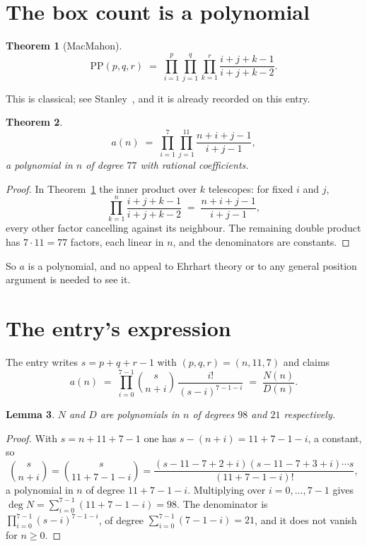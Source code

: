 \documentclass[11pt,a4paper]{article}
\theoremstyle{plain}
\newtheorem{theorem}{Theorem}
\newtheorem{lemma}[theorem]{Lemma}
\theoremstyle{definition}
\begin{document}
\section{The box count is a polynomial}

\begin{theorem}[MacMahon]\label{thm:mm}
\[
\mathrm{PP}(p,q,r)\;=\;\prod_{i=1}^{p}\prod_{j=1}^{q}\prod_{k=1}^{r}
\frac{i+j+k-1}{i+j+k-2} .
\]
\end{theorem}

This is classical; see Stanley~\cite{stanley}, and it is already recorded on this entry.

\begin{theorem}\label{thm:poly}
\[
a(n)\;=\;\prod_{i=1}^{7}\prod_{j=1}^{11}\frac{n+i+j-1}{i+j-1},
\]
a polynomial in $n$ of degree $77$ with rational coefficients.
\end{theorem}

\begin{proof}
In Theorem~\ref{thm:mm} the inner product over $k$ telescopes: for fixed $i$ and $j$,
\[
\prod_{k=1}^{n}\frac{i+j+k-1}{i+j+k-2}\;=\;\frac{n+i+j-1}{i+j-1} ,
\]
every other factor cancelling against its neighbour. The remaining double product has
$7\cdot11=77$ factors, each linear in $n$, and the denominators are constants.
\end{proof}

So $a$ is a polynomial, and no appeal to Ehrhart theory or to any general position argument is
needed to see it.

\section{The entry's expression}

The entry writes $s=p+q+r-1$ with $(p,q,r)=(n,11,7)$ and claims
\[
a(n)\;=\;\prod_{i=0}^{7-1}\binom{s}{n+i}\,\frac{i!}{(s-i)^{7-1-i}}\;=\;
\frac{N(n)}{D(n)} .
\]

\begin{lemma}\label{lem:deg}
$N$ and $D$ are polynomials in $n$ of degrees $98$ and $21$ respectively.
\end{lemma}

\begin{proof}
With $s=n+11+7-1$ one has $s-(n+i)=11+7-1-i$, a constant, so
\[
\binom{s}{n+i}=\binom{s}{11+7-1-i}
=\frac{(s-11-7+2+i)(s-11-7+3+i)\cdots s}{(11+7-1-i)!},
\]
a polynomial in $n$ of degree $11+7-1-i$. Multiplying over $i=0,\dots,7-1$ gives
$\deg N=\sum_{i=0}^{7-1}(11+7-1-i)=98$. The denominator is
$\prod_{i=0}^{7-1}(s-i)^{7-1-i}$, of degree
$\sum_{i=0}^{7-1}(7-1-i)=21$, and it does not vanish for $n\ge0$.
\end{proof}
\end{document}
